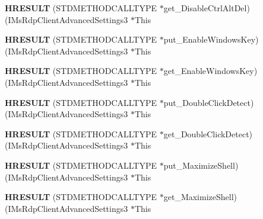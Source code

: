 \begin{DoxyCompactItemize}
{\bfseries H\+R\+E\+S\+U\+LT} (S\+T\+D\+M\+E\+T\+H\+O\+D\+C\+A\+L\+L\+T\+Y\+PE $\ast$get\+\_\+\+Disable\+Ctrl\+Alt\+Del)(I\+Ms\+Rdp\+Client\+Advanced\+Settings3 $\ast$This
\item 
\mbox{\label{struct_i_ms_rdp_client_advanced_settings3_vtbl_a5a0b30617f3392e843feede888a0568b}} 
{\bfseries H\+R\+E\+S\+U\+LT} (S\+T\+D\+M\+E\+T\+H\+O\+D\+C\+A\+L\+L\+T\+Y\+PE $\ast$put\+\_\+\+Enable\+Windows\+Key)(I\+Ms\+Rdp\+Client\+Advanced\+Settings3 $\ast$This
\item 
\mbox{\label{struct_i_ms_rdp_client_advanced_settings3_vtbl_a832b32df3284c167f5b3317f787262eb}} 
{\bfseries H\+R\+E\+S\+U\+LT} (S\+T\+D\+M\+E\+T\+H\+O\+D\+C\+A\+L\+L\+T\+Y\+PE $\ast$get\+\_\+\+Enable\+Windows\+Key)(I\+Ms\+Rdp\+Client\+Advanced\+Settings3 $\ast$This
\item 
\mbox{\label{struct_i_ms_rdp_client_advanced_settings3_vtbl_a6f985f69b5bfee73221d649e0c064a8c}} 
{\bfseries H\+R\+E\+S\+U\+LT} (S\+T\+D\+M\+E\+T\+H\+O\+D\+C\+A\+L\+L\+T\+Y\+PE $\ast$put\+\_\+\+Double\+Click\+Detect)(I\+Ms\+Rdp\+Client\+Advanced\+Settings3 $\ast$This
\item 
\mbox{\label{struct_i_ms_rdp_client_advanced_settings3_vtbl_a5018d7a8659bc399b6d99b41c88b0f5f}} 
{\bfseries H\+R\+E\+S\+U\+LT} (S\+T\+D\+M\+E\+T\+H\+O\+D\+C\+A\+L\+L\+T\+Y\+PE $\ast$get\+\_\+\+Double\+Click\+Detect)(I\+Ms\+Rdp\+Client\+Advanced\+Settings3 $\ast$This
\item 
\mbox{\label{struct_i_ms_rdp_client_advanced_settings3_vtbl_af8f0ab64283f9e3c6ebfaf4c554cb1b4}} 
{\bfseries H\+R\+E\+S\+U\+LT} (S\+T\+D\+M\+E\+T\+H\+O\+D\+C\+A\+L\+L\+T\+Y\+PE $\ast$put\+\_\+\+Maximize\+Shell)(I\+Ms\+Rdp\+Client\+Advanced\+Settings3 $\ast$This
\item 
\mbox{\label{struct_i_ms_rdp_client_advanced_settings3_vtbl_aa180935cf758f8ea7df4e50f66a32849}} 
{\bfseries H\+R\+E\+S\+U\+LT} (S\+T\+D\+M\+E\+T\+H\+O\+D\+C\+A\+L\+L\+T\+Y\+PE $\ast$get\+\_\+\+Maximize\+Shell)(I\+Ms\+Rdp\+Client\+Advanced\+Settings3 $\ast$This

\end{DoxyCompactItemize}
